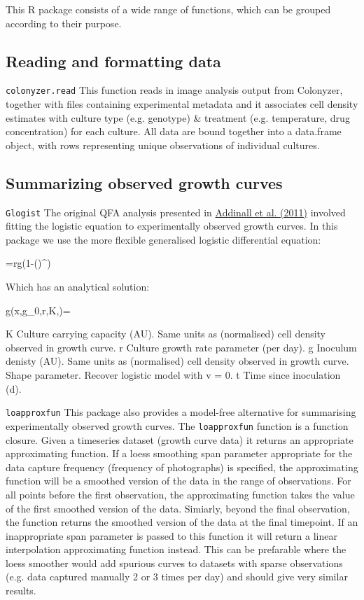 \documentclass [a4paper]{article}
\begin{document}
This R package consists of a wide range of functions, which can be grouped according to their purpose.

\subsection{Reading and formatting data}
\verb$colonyzer.read$
This function reads in image analysis output from Colonyzer, together with files containing experimental metadata and it associates cell density estimates with culture type (e.g. genotype) & treatment (e.g. temperature, drug concentration) for each culture.  All data are bound together into a data.frame object, with rows representing unique observations of individual cultures.

\subsection{Summarizing observed growth curves}
\verb$Glogist$
The original QFA analysis presented in \href{http://dx.doi.org/10.1371/journal.pgen.1001362}{Addinall et al. (2011)} involved fitting the logistic equation to experimentally observed growth curves.  In this package we use the more flexible generalised logistic differential equation:

=rg(1-()^\nu)

Which has an analytical solution:

g(x,g_0,r,K,\nu)=

K	Culture carrying capacity (AU). Same units as (normalised) cell density observed in growth curve.
r	Culture growth rate parameter (per day).
g	Inoculum denisty (AU). Same units as (normalised) cell density observed in growth curve.
\nu	Shape parameter. Recover logistic model with v = 0.
t	Time since inoculation (d).

\verb$loapproxfun$
This package also provides a model-free alternative for summarising experimentally observed growth curves.  The \verb$loapproxfun$ function is a function closure. Given a timeseries dataset (growth curve data) it returns an appropriate approximating function. If a loess smoothing span parameter appropriate for the data capture frequency (frequency of photographs) is specified, the approximating function will be a smoothed version of the data in the range of observations. For all points before the first observation, the approximating function takes the value of the first smoothed version of the data. Simiarly, beyond the final observation, the function returns the smoothed version of the data at the final timepoint. If an inappropriate span parameter is passed to this function it will return a linear interpolation approximating function instead. This can be prefarable where the loess smoother would add spurious curves to datasets with sparse observations (e.g. data captured manually 2 or 3 times per day) and should give very similar results.
\end{document}
